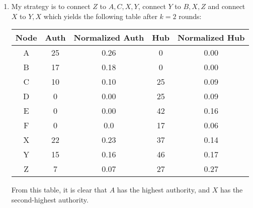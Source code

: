 \documentclass{article}
\begin{document}
\begin{enumerate}
\begin{enumerate}
        \item My strategy is to connect $Z$ to $A,C,X,Y$, connect $Y$ to $B,X,Z$ and connect $X$ to $Y,X$ which yields the following table after $k=2$ rounds:
        \begin{center}\begin{tabular}{||c | c | c | c | c ||} 
            \hline
            Node & Auth & Normalized Auth & Hub & Normalized Hub \\ [0.5ex] 
            \hline\hline
            A & 25 & 0.26 & 0 & 0.00 \\
            \hline
            B & 17 & 0.18 & 0 & 0.00 \\
            \hline
            C & 10 & 0.10 & 25 & 0.09 \\
            \hline
            D & 0 & 0.00 & 25 & 0.09 \\
            \hline
            E & 0 & 0.00 & 42 & 0.16 \\
            \hline
            F & 0 & 0.0 & 17 & 0.06 \\
            \hline
            X & 22 & 0.23 & 37 & 0.14 \\
            \hline
            Y & 15 & 0.16 & 46 & 0.17 \\
            \hline
            Z & 7 & 0.07 & 27 & 0.27 \\
            \hline
        \end{tabular}\end{center}
        From this table, it is clear that $A$ has the highest authority, and $X$ has the second-highest authority.
    \end{enumerate}

\end{enumerate}
\end{document}
